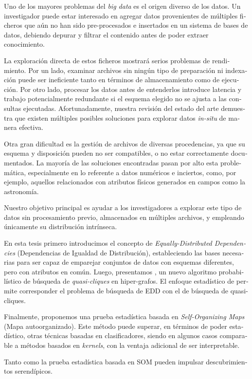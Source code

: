 \begin{otherlanguage}{spanish}
{\fontsize{11}{11}\selectfont
Uno de los mayores problemas del \textit{big data} es el origen diverso de los datos.
Un investigador puede estar interesado en agregar datos provenientes de múltiples
ficheros que aún no han sido pre-procesados e insertados en un sistema de bases de datos,
debiendo depurar y filtrar el contenido antes de poder extraer conocimiento.

La exploración directa de estos ficheros mostrará serios problemas de rendimiento.
Por un lado, examinar archivos sin ningún tipo de preparación ni indexación puede ser ineficiente tanto
en términos de almacenamiento como de ejecución. Por otro lado, procesar los datos antes de entenderlos
introduce latencia y trabajo potencialmente redundante si el esquema
elegido no se ajusta a las consultas ejecutadas. Afortunadamente, nuestra revisión del estado del arte
demuestra que existen múltiples posibles soluciones para explorar datos \emph{in-situ} de manera efectiva.

Otra gran dificultad es la gestión de archivos de diversas procedencias, ya que su esquema y disposición pueden
no ser compatibles, o no estar correctamente documentados. La mayoría de las soluciones encontradas
pasan por alto esta problemática, especialmente en lo referente a datos numéricos e inciertos,
como, por ejemplo, aquellos relacionados con atributos físicos generados en campos como la astronomía.

Nuestro objetivo principal es ayudar a los investigadores a explorar este tipo de datos sin
procesamiento previo, almacenados en múltiples archivos, y empleando únicamente su distribución intrínseca.

En esta tesis primero introducimos el concepto de \textit{Equally-Distributed Dependencies}
(Dependencias de Igualdad de Distribución), estableciendo las bases necesarias para ser capaz
de emparejar conjuntos de datos con esquemas diferentes, pero con atributos en común.
Luego, presentamos \PresQ, un nuevo algoritmo probabilístico de búsqueda de \textit{quasi-cliques} en hiper-grafos.
El enfoque estadístico de \PresQ permite corresponder el problema de búsqueda de EDD con el de búsqueda
de quasi-cliques.

Finalmente, proponemos una prueba estadística basada en \textit{Self-Organizing Maps} (Mapa autoorganizado).
Este método puede superar, en términos de poder estadístico, otras técnicas
basadas en clasificadores, siendo en algunos casos comparable a métodos basados en \textit{kernels},
con la ventaja adicional de ser interpretable.

Tanto \PresQ como la prueba estadística basada en SOM pueden impulsar descubrimientos serendípicos.
}
\end{otherlanguage}
